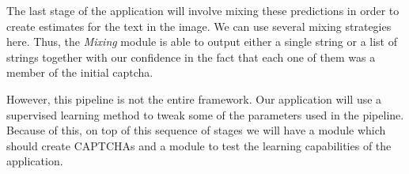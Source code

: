 \documentclass[a4paper,12pt]{article}
\begin{document}
The last stage of the application will involve mixing these predictions in
order to create estimates for the text in the image. We can use several mixing
strategies here. Thus, the \textit{Mixing} module is able to output either a
single string or a list of strings together with our confidence in the fact
that each one of them was a member of the initial captcha.

However, this pipeline is not the entire framework. Our application will use a
supervised learning method to tweak some of the parameters used in the
pipeline. Because of this, on top of this sequence of stages we will have a
module which should create CAPTCHAs and a module to test the learning
capabilities of the application.

\vskip 0.2in


\end{document}
